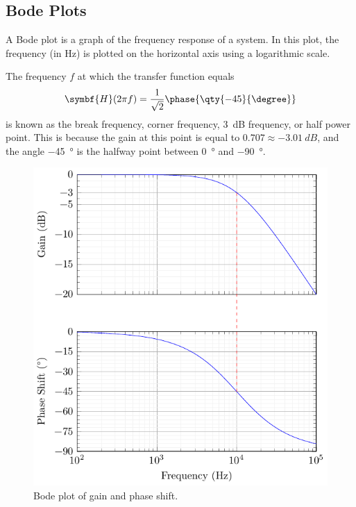 \documentclass{article}
\begin{document}
\subsection{Bode Plots}
A Bode plot is a graph of the frequency response of a system. In this
plot, the frequency (in \unit{\hertz}) is plotted on the horizontal
axis using a logarithmic scale.
\begin{definition}
    The frequency \(f\) at which the transfer function equals
    \begin{equation*}
        \symbf{H}(2\pi f) = \frac{1}{\sqrt{2}}\phase{\qty{-45}{\degree}}
    \end{equation*}
    is known as the break frequency, corner frequency,
    \qty{3}{dB} frequency, or half power point. This is because the gain
    at this point is equal to \(\num{0.707} \approx \qty{-3.01}{dB}\),
    and the angle \qty{-45}{\degree} is the halfway point between
    \qty{0}{\degree} and \qty{-90}{\degree}.
\end{definition}
\begin{figure}[H]
    \centering
    \includegraphics[width = \linewidth, keepaspectratio = true]{figures/bode_plot.pdf}
    \caption{Bode plot of gain and phase shift.}
\end{figure}
\newpage
\end{document}
